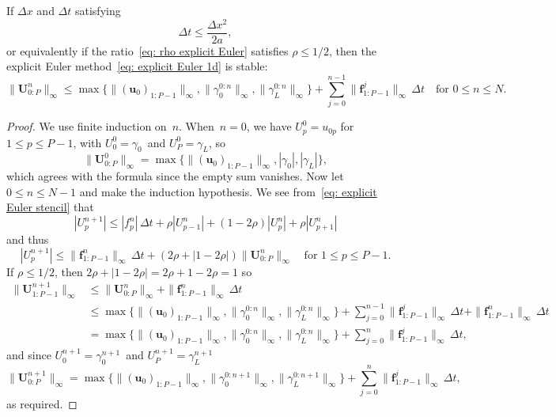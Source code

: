 \begin{theorem}\label{thm: explicit Euler stability}
If $\Delta x$ and $\Delta t$ satisfying
\begin{equation}\label{eq: explicit Euler timestep}
\Delta t\le\frac{\Delta x^2}{2a},                                        
\end{equation}
or equivalently if the ratio~\eqref{eq: rho explicit Euler} satisfies 
$\rho\le1/2$, then the explicit Euler method~\eqref{eq: explicit Euler 1d} is 
stable:
\[
\|\boldsymbol{U}^n_{0:P}\|_\infty
	\le\max\bigl\{\|(\boldsymbol{u}_0)_{1:P-1}\|_\infty, 
		\|\gamma_0^{0:n}\|_\infty,\|\gamma_L^{0:n}\|_\infty\bigr\}
	+\sum_{j=0}^{n-1}\|\boldsymbol{f}^j_{1:P-1}\|_\infty\,\Delta t
\quad\text{for $0\le n\le N$.}
\]
\end{theorem}
\begin{proof}
We use finite induction on~$n$.  When~$n=0$, we have
$U^0_p=u_{0p}$ for~$1\le p\le P-1$, with $U^0_0=\gamma_0$~and $U^0_P=\gamma_L$,
so 
\[
\|\boldsymbol{U}^0_{0:P}\|_\infty=
\max\bigl\{\|(\boldsymbol{u}_0)_{1:P-1}\|_\infty,|\gamma_0|,|\gamma_L|\bigr\},
\]
which agrees with the formula since the empty sum vanishes. Now let 
$0\le n\le N-1$ and make the induction hypothesis.  We see 
from~\eqref{eq: explicit Euler stencil} that
\[
|U^{n+1}_p|\le|f^n_p|\,\Delta t+\rho|U^n_{p-1}|+(1-2\rho)|U^n_p|+\rho|U^n_{p+1}|
\]
and thus
\[
|U^{n+1}_p|\le\|\boldsymbol{f}^n_{1:P-1}\|_\infty\,\Delta t
		+(2\rho+|1-2\rho|)\|\boldsymbol{U}^n_{0:P}\|_\infty
\quad\text{for $1\le p\le P-1$.} 
\]
If $\rho\le1/2$, then $2\rho+|1-2\rho|=2\rho+1-2\rho=1$ so
\begin{align*}
\|\boldsymbol{U}^{n+1}_{1:P-1}\|_\infty
	&\le\|\boldsymbol{U}^n_{0:P}\|_\infty
		+\|\boldsymbol{f}^n_{1:P-1}\|_\infty\,\Delta t\\
	&\le\max\bigl\{\|(\boldsymbol{u}_0)_{1:P-1}\|_\infty, 
		\|\gamma_0^{0:n}\|_\infty,\|\gamma_L^{0:n}\|_\infty\bigr\}
	+\sum_{j=0}^{n-1}\|\boldsymbol{f}^j_{1:P-1}\|_\infty\,\Delta t
		+\|\boldsymbol{f}^n_{1:P-1}\|_\infty\,\Delta t\\
	&=\max\bigl\{\|(\boldsymbol{u}_0)_{1:P-1}\|_\infty, 
		\|\gamma_0^{0:n}\|_\infty,\|\gamma_L^{0:n}\|_\infty\bigr\}
	+\sum_{j=0}^n\|\boldsymbol{f}^j_{1:P-1}\|_\infty\,\Delta t,
\end{align*}
and since $U^{n+1}_0=\gamma_0^{n+1}$~and $U^{n+1}_P=\gamma_L^{n+1}$
\[
\|\boldsymbol{U}^{n+1}_{0:P}\|_\infty
	=\max\bigl\{\|(\boldsymbol{u}_0)_{1:P-1}\|_\infty, 
		\|\gamma_0^{0:n+1}\|_\infty,\|\gamma_L^{0:n+1}\|_\infty\bigr\}
	+\sum_{j=0}^n\|\boldsymbol{f}^j_{1:P-1}\|_\infty\,\Delta t,
\]
as required.
\end{proof}


